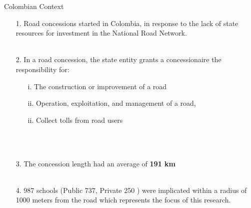 \documentclass[9pt]{beamer}
\begin{document}




\begin{frame}{Colombian Context} \label{general_context}
\justifying
    \begin{itemize}
        \item[1.]  Road concessions started in Colombia, in response to the lack of state resources for investment in the National Road Network. \\~\\ \justifying 
        \item[2.] In a road concession, the state entity grants a concessionaire the responsibility for:
            \begin{itemize}
                \item[i. ] The construction or improvement of a road
                \item[ii. ] Operation, exploitation, and management of a road,
                \item[ii. ] Collect tolls from road users
            \end{itemize} \\~\\ 
    \item[3.] The concession length had an average of \textbf{191 km} \\~\\ 
    \item[4.] 987  schools (Public 737, Private 250 ) were implicated within a radius of 1000 meters from the road which represents the focus of this research.  \\~\\ 
    
 
    \end{itemize}
 \hyperlink{roads1}{}
\end{frame}
 
\end{document}

